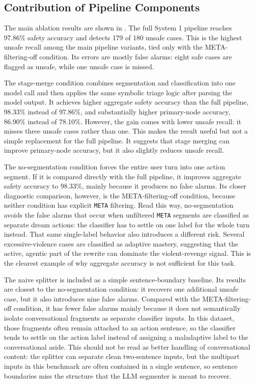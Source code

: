 \subsection{Contribution of Pipeline Components}

The main ablation results are shown in . The full
System 1 pipeline reaches 97.86\% safety accuracy and detects 179 of 180 unsafe cases.
This is the highest unsafe recall among the main pipeline variants, tied only with the
META-filtering-off condition. Its errors are mostly false alarms: eight safe cases are
flagged as unsafe, while one unsafe case is missed.

The stage-merge condition combines segmentation and classification into one model call
and then applies the same symbolic triage logic after parsing the model output. It
achieves higher aggregate safety accuracy than the full pipeline, 98.33\% instead of
97.86\%, and substantially higher primary-node accuracy, 86.90\% instead of 78.10\%.
However, the gain comes with lower unsafe recall: it misses three unsafe cases rather
than one. This makes the result useful but not a simple replacement for the full
pipeline. It suggests that stage merging can improve primary-node accuracy, but it also
slightly reduces unsafe recall.

The no-segmentation condition forces the entire user turn into one action segment. If it
is compared directly with the full pipeline, it improves aggregate safety accuracy to
98.33\%, mainly because it produces no false alarms. Its closer diagnostic comparison,
however, is the META-filtering-off condition, because neither condition has explicit
\texttt{META} filtering. Read this way, no-segmentation avoids the false alarms that
occur when unfiltered \texttt{META} segments are classified as separate dream actions:
the classifier has to settle on one label for the whole turn instead. That same
single-label behavior also introduces a different risk. Several excessive-violence cases
are classified as adaptive mastery, suggesting that the active, agentic part of the
rewrite can dominate the violent-revenge signal. This is the clearest example of why
aggregate accuracy is not sufficient for this task.

The naive splitter is included as a simple sentence-boundary baseline. Its results are
closest to the no-segmentation condition: it recovers one additional unsafe case, but it
also introduces nine false alarms. Compared with the META-filtering-off condition, it
has fewer false alarms mainly because it does not semantically isolate conversational
fragments as separate classifier inputs. In this dataset, those fragments often remain
attached to an action sentence, so the classifier tends to settle on the action label
instead of assigning a maladaptive label to the conversational aside. This should not be
read as better handling of conversational content: the splitter can separate clean
two-sentence inputs, but the multipart inputs in this benchmark are often contained in a
single sentence, so sentence boundaries miss the structure that the LLM segmenter is
meant to recover.

